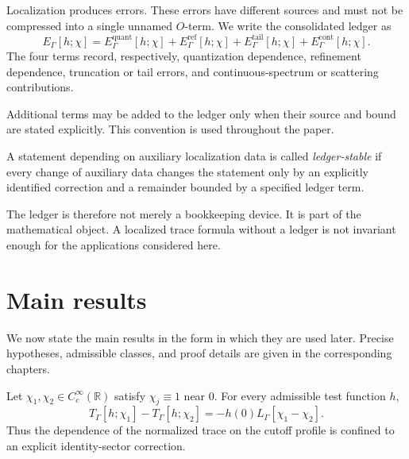 Localization produces errors.  These errors have different sources and must not be compressed into a single unnamed \(O\)-term.  We write the consolidated ledger as
\begin{equation}
  E_\Gamma[h;\chi]
  =
  E_\Gamma^{\mathrm{quant}}[h;\chi]
  +
  E_\Gamma^{\mathrm{ref}}[h;\chi]
  +
  E_\Gamma^{\mathrm{tail}}[h;\chi]
  +
  E_\Gamma^{\mathrm{cont}}[h;\chi].
  \label{eq:intro-ledger}
\end{equation}
The four terms record, respectively, quantization dependence, refinement dependence, truncation or tail errors, and continuous-spectrum or scattering contributions.

Additional terms may be added to the ledger only when their source and bound are stated explicitly.  This convention is used throughout the paper.

\begin{definition}
\label{def:intro-ledger-stable}
A statement depending on auxiliary localization data is called \emph{ledger-stable} if every change of auxiliary data changes the statement only by an explicitly identified correction and a remainder bounded by a specified ledger term.
\end{definition}

The ledger is therefore not merely a bookkeeping device.  It is part of the mathematical object.  A localized trace formula without a ledger is not invariant enough for the applications considered here.

\section{Main results}
\label{sec:intro-main-results}

We now state the main results in the form in which they are used later.  Precise hypotheses, admissible classes, and proof details are given in the corresponding chapters.

\begin{theorem}
\label{thm:intro-canonical-normalization}
Let \(\chi_1,\chi_2\in C_c^\infty(\mathbb R)\) satisfy \(\chi_j\equiv1\) near \(0\).  For every admissible test function \(h\),
\begin{equation}
  T_\Gamma[h;\chi_1]
  -
  T_\Gamma[h;\chi_2]
  =
  -h(0)L_\Gamma[\chi_1-\chi_2].
  \label{eq:intro-cutoff-change}
\end{equation}
Thus the dependence of the normalized trace on the cutoff profile is confined to an explicit identity-sector correction.
\end{theorem}

